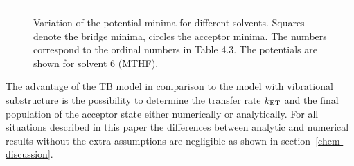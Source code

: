 \documentclass[12pt,twoside,a4paper]{report}
\begin{document}
\begin{footnotesize}\begin{figure}[!h]
  \begin{center}
\parbox{4.0cm}{\rule{-3cm}{.1cm}\epsfxsize=10.0cm}
    \leavevmode
    \caption[Variation of the potential minima for different solvents.]
     {\small 
      \label{potential-minima}     
      Variation of the potential minima for different solvents.
      Squares denote the bridge minima, circles the acceptor minima.
      The numbers correspond to the ordinal numbers in Table 4.3. The potentials
      are shown for solvent 6  (MTHF). }
  \end{center}
\end{figure}\end{footnotesize}


  
The advantage of the TB model 
in comparison to the model with vibrational substructure 
is the possibility to
determine the transfer rate $k_{\rm ET}$ and the final population of
the acceptor state either numerically or analytically.  
For all situations described in this paper the
differences between analytic and numerical results without the extra
assumptions are negligible as shown in section~\ref{chem-discussion}.

\end{document}
